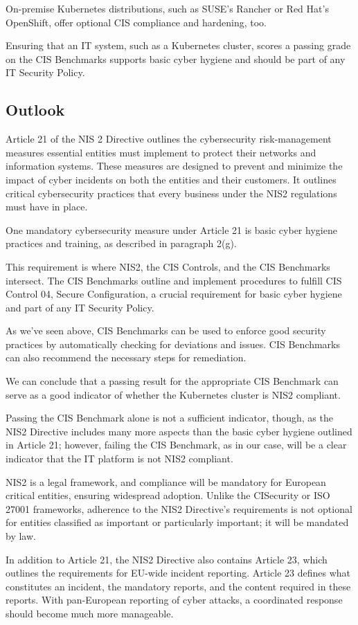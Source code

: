 On-premise Kubernetes distributions, such as SUSE's Rancher or Red Hat's OpenShift, offer optional CIS compliance and hardening, too. 

Ensuring that an IT system, such as a Kubernetes cluster, scores a passing grade on the CIS Benchmarks supports basic cyber hygiene and should be part of any IT Security Policy.

\subsection{Outlook}

Article 21 of the NIS 2 Directive outlines the cybersecurity risk-management measures essential entities must implement to protect their networks and information systems. These measures are designed to prevent and minimize the impact of cyber incidents on both the entities and their customers. It outlines critical cybersecurity practices that every business under the NIS2 regulations must have in place. 

One mandatory cybersecurity measure under Article 21 is basic cyber hygiene practices and training, as described in paragraph 2(g).

This requirement is where NIS2, the CIS Controls, and the CIS Benchmarks intersect. The CIS Benchmarks outline and implement procedures to fulfill CIS Control 04, Secure Configuration, a crucial requirement for basic cyber hygiene and part of any IT Security Policy.

As we've seen above, CIS Benchmarks can be used to enforce good security practices by automatically checking for deviations and issues. CIS Benchmarks can also recommend the necessary steps for remediation.

We can conclude that a passing result for the appropriate CIS Benchmark can serve as a good indicator of whether the Kubernetes cluster is NIS2 compliant.

Passing the CIS Benchmark alone is not a sufficient indicator, though, as the NIS2 Directive includes many more aspects than the basic cyber hygiene outlined in Article 21; however, failing the CIS Benchmark, as in our case, will be a clear indicator that the IT platform is not NIS2 compliant.

NIS2 is a legal framework, and compliance will be mandatory for European critical entities, ensuring widespread adoption. Unlike the CISecurity or ISO 27001 frameworks, adherence to the NIS2 Directive's requirements is not optional for entities classified as important or particularly important; it will be mandated by law.

In addition to Article 21, the NIS2 Directive also contains Article 23, which outlines the requirements for EU-wide incident reporting. Article 23 defines what constitutes an incident, the mandatory reports, and the content required in these reports. With pan-European reporting of cyber attacks, a coordinated response should become much more manageable.
